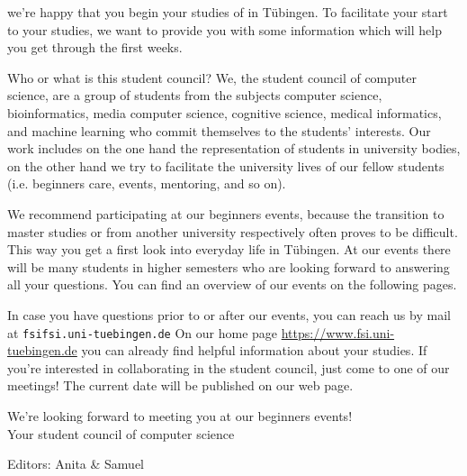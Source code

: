 \thispagestyle{firststyle}
we're happy that you begin your studies of \studiengang in Tübingen.
To facilitate your start to your studies, we want to provide you with some information which will help you get through the first weeks.

Who or what is this \glqq student council\grqq? We, the student council of computer science, are a group of students from the subjects computer science, bioinformatics, media computer science, cognitive science, medical informatics, and machine learning
who commit themselves to the students' interests. Our work includes on the one hand the representation of students in university bodies, on the other hand we try to facilitate the university lives of our fellow students (i.e. beginners care,
events, mentoring, and so on).

\ifmaster
    \ifml
We recommend participating at our beginners events, because the transition to master studies or from another university respectively often proves to be difficult. This way you get a first look into everyday life in Tübingen.
    \fi
\fi 
At our events there will be many students in higher semesters who are looking forward to answering all your questions. You can find an overview of our events on the following pages.

In case you have questions prior to or after our events, you can reach us by mail at \texttt{fsi\At fsi.uni-tuebingen.de}
On our home page
\url{https://www.fsi.uni-tuebingen.de} you can already find helpful information about your studies. If you're interested in collaborating in the student council, just come to one of our meetings! The current date will be published on our web page.

We're looking forward to meeting you at our beginners events!\\
Your student council of computer science
\par\hfill{\footnotesize Editors: Anita \& Samuel}
\vfill

